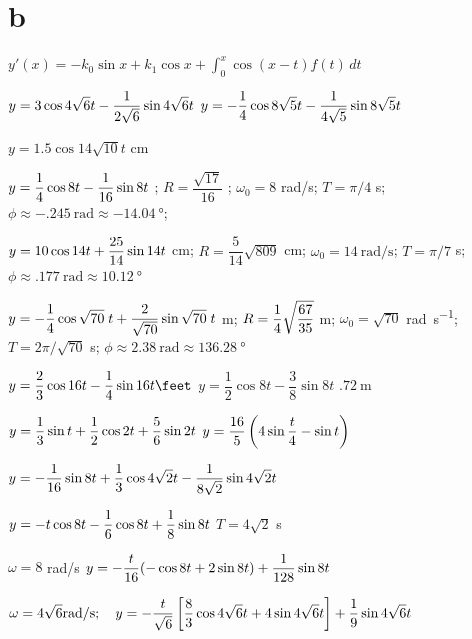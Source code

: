 \part{b} $y'(x)=-k_0\sin x+k_1\cos x+\int_0^x\cos (x-t)
f(t)\,dt$




   $y=\displaystyle{3 \cos4\sqrt{6}t-\frac{1}{2\sqrt{6}} \sin 4\sqrt{6} t}$ \unit{\feet}
  $y=\displaystyle{ -\frac{1}{4}\cos8\sqrt{5}t-\frac{1}{4\sqrt{5}}\sin8\sqrt{5}t}$ \unit{\feet}

  $y=1.5\cos14\sqrt{10}t$ \unit{\centi\meter}

$y=\displaystyle{\frac{1}{4}\cos8t-\frac{1}{16}\sin8t}$ \unit{\feet};\;
$R=\dfrac{\sqrt{17}}{16}$ \unit{\feet};\; $\omega_0=8$ rad/s;\; $T=\pi/4$ \unit{\second}; $\phi\approx\qty{-.245}{\radian}\approx\qty{-14.04}{\degree}$;

$y=\displaystyle{10\cos14t+\frac{25}{14}\sin14t}$ \unit{\centi\meter};
$R=\dfrac{5}{14}\sqrt{809}$ \unit{\centi\meter}; $\omega_0=\qty{14}{\radian\per\second}$;
 $T=\pi/7$ \unit{\second}; $\phi\approx\qty{.177}{\radian}\approx\qty{10.12}{\degree}$

$y=\displaystyle{-\frac{1}{4}\cos\sqrt{70}\;  t+\frac{2}{\sqrt{70}}\sin\sqrt{70}\;   t}$ \unit{\meter};
$R= \displaystyle{\frac{1}{4}\sqrt{\frac{67}{35}}}$ \unit{\meter};
$\omega_0=\sqrt{70}$ \unit{\radian\per\second};
$T=2\pi/\sqrt{70}$ \unit{\second};
$\phi\approx\qty{2.38}{\radian}\approx\qty{136.28}{\degree}$

 $y=\dfrac{2}{3}\cos16t-\dfrac{1}{4}\sin16t \unit{\feet}$
 $y=\dfrac{1}{2}\cos8t-\dfrac{3}{8}\sin8t$ \unit{\feet}
  $\qty{.72}{\meter}$

  $y=\displaystyle{\frac{1}{3}\sin t +\frac{1}{2}\cos2t+\frac{5}{6}\sin2t}$ \unit{\feet}
$y=\displaystyle{\frac{16}{5}\left(4\sin \frac{t}{4}-\sin t\right)}$

 $y=\displaystyle{-\frac{1}{16} \sin8t+\frac{1}{3}\cos4\sqrt2 t -\frac{1}{8\sqrt2}\sin4\sqrt2 t}$

 $y=\displaystyle{-t\cos8t-\frac{1}{6}\cos8t+\frac{1}{8} \sin8t}$ \unit{\feet}
  $T=4\sqrt{2}$ s

 $\omega=8$ rad/s
$y=-\displaystyle{\frac{t}{16}(-\cos8t+2\sin 8t)+\frac{1}{128}\sin 8t}$ \unit{\feet}

 $\dst{\omega=4\sqrt6\unit{\radian\per\second};  \quad y=-\frac{t}{\sqrt{6}}\left[\frac{8}{3}\cos4\sqrt{6}t+4\sin
4\sqrt{6}t\right]+\frac{1}{9}\sin 4\sqrt{6} t}$ \unit{\feet}

